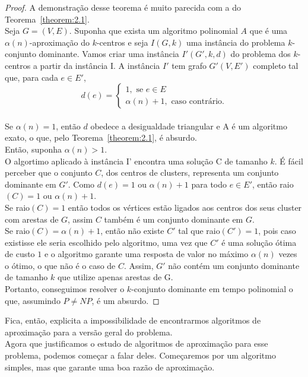 \documentclass[12pt]{article}
\newcommand{\NP}{\mathit{NP}}
\begin{document}
\begin{proof}
        A demonstração desse teorema é muito parecida com a do Teorema~\ref{theorem:2.1}. \\
        Seja $G = (V,E)$. Suponha que exista um algoritmo polinomial $A$ que é uma $\alpha(n)$-aproximação do $k$-centros e seja $I(G,k)$ uma instância do problema $k$-conjunto dominante. Vamos criar uma instância $I'(G',k,d)$ do problema dos $k$-centros a partir da instância I. A instância $I'$ tem grafo $G'(V,E')$ completo tal que, para cada $e \in E'$, \\
    \[d(e) = \begin{cases}
            1, \text{ se } e \in E \\
            \alpha(n)+1, \text{ caso contrário.} 
            \end{cases}\]\\
    Se $\alpha(n)=1$, então $d$ obedece a desigualdade triangular e A é um algoritmo exato, o que, pelo Teorema~\ref{theorem:2.1}, é absurdo. \\
    Então, suponha $\alpha(n)>1$. \\
    O algortimo aplicado à instância I' encontra uma solução C de tamanho $k$. É fácil perceber que o conjunto $C$, dos centros de clusters, representa um conjunto dominante em $G'$. Como $d(e) = 1$ ou $\alpha(n)+1$ para todo $e \in E'$, então raio$(C)=1$ ou $\alpha(n)+1$.\\
    Se raio$(C)=1$ então todos os vértices estão ligados aos centros dos seus cluster com arestas de $G$, assim $C$ também é um conjunto dominante em $G$. \\
    Se raio$(C) = \alpha(n) + 1$, então não existe $C'$ tal que raio$(C')=1$, pois caso existisse ele seria escolhido pelo algoritmo, uma vez que $C'$ é uma solução ótima de custo $1$ e o algoritmo garante uma resposta de valor no máximo $\alpha(n)$ vezes o ótimo, o que não é o caso de $C$. Assim, $G'$ não contém um conjunto dominante de tamanho $k$ que utilize apenas arestas de G. \\
    Portanto, conseguimos resolver o $k$-conjunto dominante em tempo polinomial o que, assumindo $P \not= \NP$, é um absurdo.
\end{proof}
    Fica, então, explicita a impossibilidade de encontrarmos algoritmos de aproximação para a versão geral do problema. \\
    Agora que justificamos o estudo de algoritmos de aproximação para esse problema, podemos começar a falar deles. Começaremos por um algoritmo simples, mas que garante uma boa razão de aproximação.
    
\end{document}
